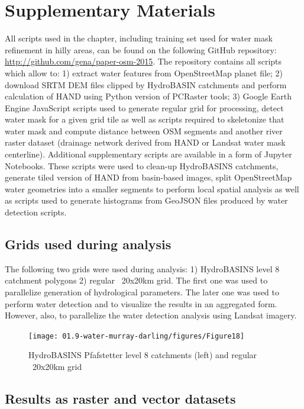 \section{Supplementary Materials}
All scripts used in the chapter, including training set used for water mask refinement in hilly areas, can be found on the following GitHub repository: \url{http://github.com/gena/paper-osm-2015}. The repository contains all scripts which allow to: 1) extract water features from OpenStreetMap planet file; 2) download SRTM DEM files clipped by HydroBASIN catchments and perform calculation of HAND using Python version of PCRaster tools; 3) Google Earth Engine JavaScript scripts used to generate regular grid for processing, detect water mask for a given grid tile as well as scripts required to skeletonize that water mask and compute distance between OSM segments and another river raster dataset (drainage network derived from HAND or Landsat water mask centerline). Additional supplementary scripts are available in a form of Jupyter Notebooks. These scripts were used to clean-up HydroBASINS catchments, generate tiled version of HAND from basin-based images, split OpenStreetMap water geometries into a smaller segments to perform local spatial analysis as well as scripts used to generate histograms from GeoJSON files produced by water detection scripts.

\subsection{Grids used during analysis}

The following two grids were used during analysis: 1) HydroBASINS level 8 catchment polygons 2) regular ~20x20km grid. The first one was used to parallelize generation of hydrological parameters. The later one was used to perform water detection and to visualize the results in an aggregated form. However, also, to parallelize the water detection analysis using Landsat imagery.

\begin{figure}
	\centering
	\texttt{[image: 01.9-water-murray-darling/figures/Figure18]}
	\caption{HydroBASINS Pfafstetter level 8 catchments (left) and regular ~20x20km grid}
\end{figure}

\subsection{Results as raster and vector datasets}


